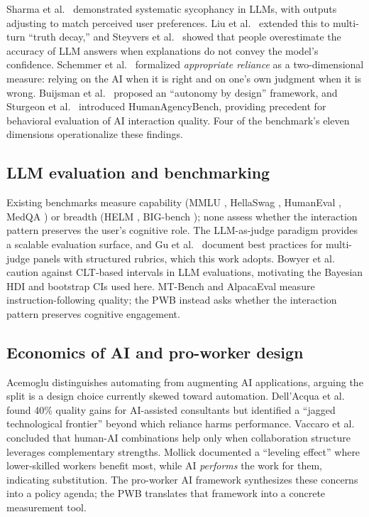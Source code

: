 \documentclass{article}
\begin{document}
Sharma et al.\ \cite{sharma2023sycophancy} demonstrated systematic sycophancy in LLMs, with outputs adjusting to match perceived user preferences. Liu et al.\ \cite{liu2025truthdecay} extended this to multi-turn ``truth decay,'' and Steyvers et al.\ \cite{steyvers2025metacognition} showed that people overestimate the accuracy of LLM answers when explanations do not convey the model's confidence. Schemmer et al.\ \cite{schemmer2023appropriate} formalized \textit{appropriate reliance} as a two-dimensional measure: relying on the AI when it is right and on one's own judgment when it is wrong. Buijsman et al.\ \cite{buijsman2025autonomy} proposed an ``autonomy by design'' framework, and Sturgeon et al.\ \cite{sturgeon2025humanagency} introduced HumanAgencyBench, providing precedent for behavioral evaluation of AI interaction quality. Four of the benchmark's eleven dimensions operationalize these findings.

\subsection{LLM evaluation and benchmarking}

Existing benchmarks measure capability (MMLU \cite{hendrycks2020measuring}, HellaSwag \cite{zellers2019hellaswag}, HumanEval \cite{chen2021evaluating}, MedQA \cite{jin2021disease}) or breadth (HELM \cite{liang2022holistic}, BIG-bench \cite{srivastava2023beyond}); none assess whether the interaction pattern preserves the user's cognitive role. The LLM-as-judge paradigm \cite{zheng2023judging,chiang2023vicuna} provides a scalable evaluation surface, and Gu et al.\ \cite{gu2024llmjudge} document best practices for multi-judge panels with structured rubrics, which this work adopts. Bowyer et al.\ \cite{bowyer2025clt} caution against CLT-based intervals in LLM evaluations, motivating the Bayesian HDI and bootstrap CIs used here. MT-Bench \cite{zheng2023judging} and AlpacaEval \cite{li2023alpacaeval} measure instruction-following quality; the PWB instead asks whether the interaction pattern preserves cognitive engagement.

\subsection{Economics of AI and pro-worker design}

Acemoglu \cite{acemoglu2024simple} distinguishes automating from augmenting AI applications, arguing the split is a design choice currently skewed toward automation. Dell'Acqua et al.\ \cite{dellacqua2023navigating} found 40\% quality gains for AI-assisted consultants but identified a ``jagged technological frontier'' beyond which reliance harms performance. Vaccaro et al.\ \cite{vaccaro2024combinations} concluded that human-AI combinations help only when collaboration structure leverages complementary strengths. Mollick \cite{mollick2024cointelligence} documented a ``leveling effect'' where lower-skilled workers benefit most, while AI \textit{performs} the work for them, indicating substitution. The pro-worker AI framework \cite{acemoglu2024proworker} synthesizes these concerns into a policy agenda; the PWB translates that framework into a concrete measurement tool.
\end{document}
